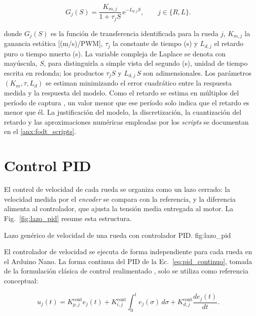 \begin{equation}
G_j(S)
=
\frac{K_{m,j}}{1+\tau_j S}\,
\mathrm{e}^{-L_{d,j}S},
\qquad j\in\{R,L\}.
\label{eq:fodt}
\end{equation}

\noindent donde $G_j(S)$ es la función de transferencia identificada para la
rueda $j$, $K_{m,j}$ la ganancia estática [(m/s)/PWM], $\tau_j$ la constante
de tiempo (s) y $L_{d,j}$ el retardo puro o tiempo muerto (s). La variable
compleja de Laplace se denota con mayúscula, $S$, para distinguirla a simple
vista del segundo (s), unidad de tiempo escrita en redonda; los productos
$\tau_j S$ y $L_{d,j}\,S$ son adimensionales.
Los parámetros $(K_m,\tau,L_d)$ se estiman minimizando el error
cuadrático entre la respuesta medida y la respuesta del modelo. Como el retardo
se estima en múltiplos del período de captura \citep[Sec.~2.4]{maxim2023fopdt},
un valor menor que ese período solo indica que el retardo es menor que él. La
justificación del modelo, la discretización, la cuantización del retardo y las
aproximaciones numéricas empleadas por los \textit{scripts} se documentan en el
\ref{anx:fodt_scripts}.

\section{Control PID}
\label{sec:pid}

El control de velocidad de cada rueda se organiza como un lazo cerrado: la
velocidad medida por el \textit{encoder} se compara con la referencia, y la diferencia
alimenta al controlador, que ajusta la tensión media entregada al motor. La
Fig.~\ref{fig:lazo_pid} resume esta estructura.

{Lazo genérico de velocidad de una rueda con controlador PID.}
{fig:lazo_pid}

El controlador de velocidad se ejecuta de forma independiente para cada rueda en el Arduino Nano. La forma continua del PID de la Ec.~\eqref{eq:pid_continuo}, tomada de la formulación clásica de control realimentado \citep[Sec.~3.2]{astrom2009controlpid}, solo se utiliza como referencia conceptual:

\begin{equation}
u_j(t)
=
K_{p,j}^{\mathrm{cont}}e_j(t)
+
K_{i,j}^{\mathrm{cont}}\int_0^t e_j(\sigma)\,d\sigma
+
K_{d,j}^{\mathrm{cont}}\frac{de_j(t)}{dt}.
\label{eq:pid_continuo}
\end{equation}

